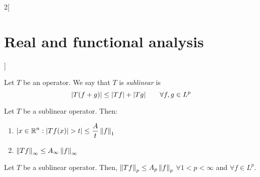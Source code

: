 \documentclass[../../../main_math.tex]{subfiles}
\begin{document}
\begin{multicols}{2}[\section{Real and functional analysis}]
\begin{theorem}
  \end{theorem}
  \begin{definition}
    Let $T$ be an operator. We say that $T$ is \emph{sublinear} is $$\abs{T(f+g)}\leq \abs{Tf}+\abs{Tg}\qquad\forall f,g\in L^p$$
  \end{definition}
  \begin{theorem}
    Let $T$ be a sublinear operator. Then:
    \begin{enumerate}
      \item $\displaystyle\m{x\in\RR^n:\abs{Tf(x)}>t}\leq \frac{A}{t}\norm{f}_1$
      \item $\left\|Tf\right\|_\infty\leq A_\infty\left\|f\right\|_\infty$
    \end{enumerate}
  \end{theorem}
  \begin{corollary}
    Let $T$ be a sublinear operator. Then, $\left\|Tf\right\|_p\leq A_p\left\|f\right\|_p$ $\forall 1<p<\infty$ and $\forall f\in L^p$.
  \end{corollary}

\end{multicols}
\end{document}
